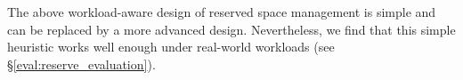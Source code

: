 
The above workload-aware design of reserved space management is simple and can
be replaced by a more advanced design.  Nevertheless, we find that this simple
heuristic works well enough under real-world workloads (see
\S\ref{eval:reserve_evaluation}). 



